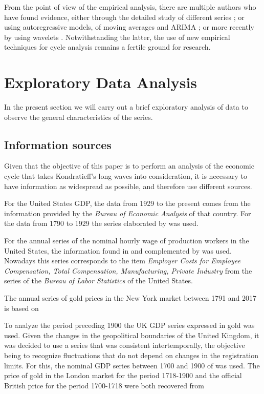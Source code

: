 \documentclass[a4paper]{article}
\begin{document}
From the point of view of the empirical analysis, there are multiple authors who have found evidence, either through the detailed study of different series \citep{kuznets1930secular, kondratieff1979long, schumpeter1939business}; or using autoregressive models, of moving averages and ARIMA \citep {hamilton1989new, kaiser2012measuring}; or more recently by using wavelets \citep {yogo2008measuring, soares2011business}. Notwithstanding the latter, the use of new empirical techniques for cycle analysis remains a fertile ground for research.

\section{Exploratory Data Analysis}\label{EDA}

In the present section we will carry out a brief exploratory analysis of data to observe the general characteristics of the series.

\subsection{Information sources}

Given that the objective of this paper is to perform an analysis of the economic cycle that takes Kondratieff's long waves into consideration, it is necessary to have information as widespread as possible, and therefore use different sources.

For the United States GDP, the data from 1929 to the present comes from the information provided by the \textit{Bureau of Economic Analysis} of that country. For the data from 1790 to 1929 the series elaborated by \cite{johnston2018us} was used.

For the annual series of the nominal hourly wage of production workers in the United States, the information found in \cite{officer2009two} and complemented by \cite{Roesch2018} was used. Nowadays this series corresponds to the item \textit{Employer Costs for Employee Compensation, Total Compensation, Manufacturing, Private Industry} from the series of the \textit{Bureau of Labor Statistics} of the United States.

The annual series of gold prices in the New York market between 1791 and 2017 is based on \cite{officer2018gold}

To analyze the period preceding 1900 the UK GDP series expressed in gold was used. Given the changes in the geopolitical boundaries of the United Kingdom, it was decided to use a series that was consistent intertemporally, the objective being to recognize fluctuations that do not depend on changes in the registration limits. For this, the nominal GDP series between 1700 and 1900 of \cite{Williamson2018uk} was used. The price of gold in the London market for the period 1718-1900 and the official British price for the period 1700-1718 were both recovered from \cite{officer2018gold}
\end{document}
